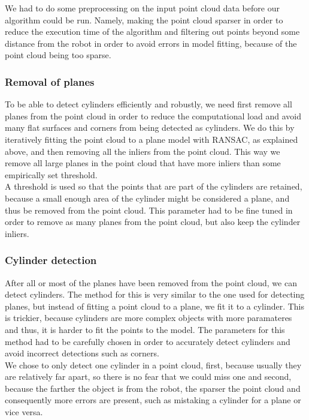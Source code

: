 \documentclass[12pt,a4paper]{article}
\begin{document}
	We had to do some preprocessing on the input point cloud data before our algorithm could be run. Namely, making the point cloud sparser in order to reduce the execution time of the algorithm and filtering out points beyond some distance from the robot in order to avoid errors in model fitting, because of the point cloud being too sparse. \\
	
	\subsubsection{Removal of planes}
	To be able to detect cylinders efficiently and robustly, we need first remove all planes from the point cloud in order to reduce the computational load and avoid many flat surfaces and corners from being detected as cylinders. We do this by iteratively fitting the point cloud to a plane model with RANSAC, as explained above, and then removing all the inliers from the point cloud. This way we remove all large planes in the point cloud that have more inliers than some empirically set threshold. \\
	
	A threshold is used so that the points that are part of the cylinders are retained, because a small enough area of the cylinder might be considered a plane, and thus be removed from the point cloud. This parameter had to be fine tuned in order to remove as many planes from the point cloud, but also keep the cylinder inliers. \\

	\subsubsection{Cylinder detection}
	After all or most of the planes have been removed from the point cloud, we can detect cylinders. The method for this is very similar to the one used for detecting planes, but instead of fitting a point cloud to a plane, we fit it to a cylinder. This is trickier, because cylinders are more complex objects with more paramateres and thus, it is harder to fit the points to the model. The parameters for this method had to be carefully chosen in order to accurately detect cylinders and avoid incorrect detections such as corners. \\

	We chose to only detect one cylinder in a point cloud, first, because usually they are relatively far apart, so there is no fear that we could miss one and second, because the farther the object is from the robot, the sparser the point cloud and consequently more errors are present, such as mistaking a cylinder for a plane or vice versa. \\
	
\end{document}
